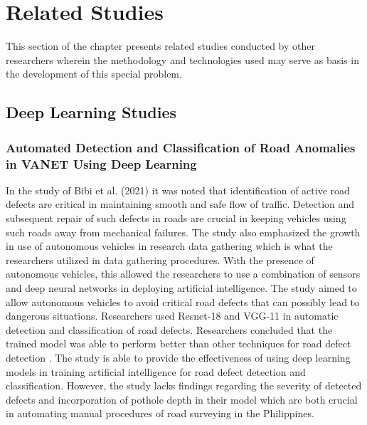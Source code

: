 \section{Related Studies}
This section of the chapter presents related studies conducted by other researchers wherein the methodology and technologies used may serve as basis in the development of this special problem.

\subsection{Deep Learning Studies}

\subsubsection{Automated Detection and Classification of Road Anomalies in VANET Using Deep Learning}
In the study of Bibi et al. (2021) it was noted that identification of active road defects are critical in maintaining smooth and safe flow of traffic. Detection and subsequent repair of such defects in roads are crucial in keeping vehicles using such roads away from mechanical failures. The study also emphasized the growth in use of autonomous vehicles in research data gathering which is what the researchers utilized in data gathering procedures. With the presence of autonomous vehicles, this allowed the researchers to use a combination of sensors and deep neural networks in deploying artificial intelligence. The study aimed to allow autonomous vehicles to avoid critical road defects that can possibly lead to dangerous situations. Researchers used Resnet-18 and VGG-11 in automatic detection and classification of road defects. Researchers concluded that the trained model was able to perform better than other techniques for road defect detection \cite{bibi2021}. The study is able to provide the effectiveness of using deep learning models in training artificial intelligence for road defect detection and classification. However, the study lacks findings regarding the severity of detected defects and incorporation of pothole depth in their model which are both crucial in automating manual procedures of road surveying in the Philippines.

